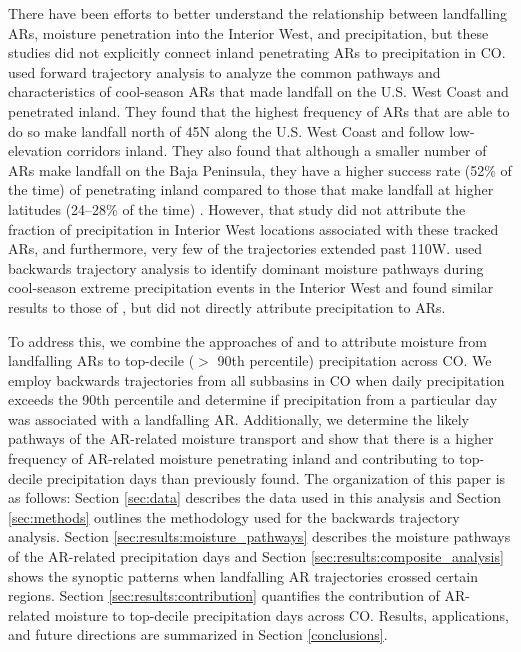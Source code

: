 \documentclass[draft]{agujournal2019}
\begin{document}
There have been efforts to better understand the relationship between landfalling ARs, moisture penetration into the Interior West, and precipitation, but these studies did not explicitly connect inland penetrating ARs to precipitation in CO.  used forward trajectory analysis to analyze the common pathways and characteristics of cool-season ARs that made landfall on the U.S. West Coast and penetrated inland. They found that the highest frequency of ARs that are able to do so make landfall north of 45\textdegree N along the U.S. West Coast and follow low-elevation corridors inland. They also found that although a smaller number of ARs make landfall on the Baja Peninsula, they have a higher success rate (52\% of the time) of penetrating inland compared to those that make landfall at higher latitudes (24--28\% of the time) \cite{Rutz2015}. However, that study did not attribute the fraction of precipitation in Interior West locations associated with these tracked ARs, and furthermore, very few of the trajectories extended past 110\textdegree W.  used backwards trajectory analysis to identify dominant moisture pathways during cool-season extreme precipitation events in the Interior West and found similar results to those of , but did not directly attribute precipitation to ARs. 

To address this, we combine the approaches of  and  to attribute moisture from landfalling ARs to top-decile ($>$ 90th percentile) precipitation across CO. We employ backwards trajectories from all subbasins in CO when daily precipitation exceeds the 90th percentile and determine if precipitation from a particular day was associated with a landfalling AR. Additionally, we determine the likely pathways of the AR-related moisture transport and show that there is a higher frequency of AR-related moisture penetrating inland and contributing to top-decile precipitation days than previously found. The organization of this paper is as follows: Section \ref{sec:data} describes the data used in this analysis and Section \ref{sec:methods} outlines the methodology used for the backwards trajectory analysis. Section \ref{sec:results:moisture_pathways} describes the moisture pathways of the AR-related precipitation days and Section \ref{sec:results:composite_analysis} shows the synoptic patterns when landfalling AR trajectories crossed certain regions. Section \ref{sec:results:contribution} quantifies the contribution of AR-related moisture to top-decile precipitation days across CO. Results, applications, and future directions are summarized in Section \ref{conclusions}. 
\end{document}
